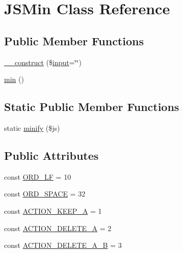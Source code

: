 \hypertarget{classJSMin}{}\section{J\+S\+Min Class Reference}
\label{classJSMin}
\subsection*{Public Member Functions}
\begin{DoxyCompactItemize}
\item 
\hyperlink{classJSMin_a9fcb3a53ccc63a886657053d1609fbf6}{\+\_\+\+\_\+construct} (\$\hyperlink{Shape_8php_a6210da308e7ce036a6362dca3018d6db}{input}=\char`\"{}\char`\"{})
\item 
\hyperlink{classJSMin_a1b73b6860c523a036772bcdf8c99a6ff}{min} ()
\end{DoxyCompactItemize}
\subsection*{Static Public Member Functions}
\begin{DoxyCompactItemize}
\item 
static \hyperlink{classJSMin_a524912007600454e4396aea890384ab6}{minify} (\$js)
\end{DoxyCompactItemize}
\subsection*{Public Attributes}
\begin{DoxyCompactItemize}
\item 
const \hyperlink{classJSMin_ac2104a1ac3a1d438c01c88b7bfafd519}{O\+R\+D\+\_\+\+L\+F} = 10
\item 
const \hyperlink{classJSMin_acae1641c88dbf4928c4a3c5b2428065c}{O\+R\+D\+\_\+\+S\+P\+A\+C\+E} = 32
\item 
const \hyperlink{classJSMin_aadc96fb8e03e7fd45dcc845695db56f6}{A\+C\+T\+I\+O\+N\+\_\+\+K\+E\+E\+P\+\_\+\+A} = 1
\item 
const \hyperlink{classJSMin_a034ff6ce80d8eeffb1548c65b907db73}{A\+C\+T\+I\+O\+N\+\_\+\+D\+E\+L\+E\+T\+E\+\_\+\+A} = 2
\item 
const \hyperlink{classJSMin_a769648a1f5c364c3d964d12d0b4edb8a}{A\+C\+T\+I\+O\+N\+\_\+\+D\+E\+L\+E\+T\+E\+\_\+\+A\+\_\+\+B} = 3
\end{DoxyCompactItemize}
